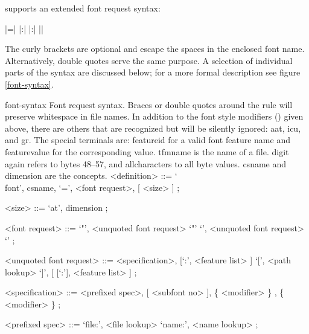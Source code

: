 \endsection


 supports an extended font request syntax:

\beginnarrower
      |\font\foo={|%
      |:|%
      |:|%
      |}|%
\endnarrower

\noindent
The curly brackets are optional and escape the spaces in the enclosed
font name.
%
Alternatively, double quotes serve the same purpose.
%
A selection of individual parts of the syntax are discussed below;
for a more formal description see figure \ref{font-syntax}.

\beginsyntaxfloat
  {font-syntax}
  {Font request syntax.
   Braces or double quotes around the
    rule will
   preserve whitespace in file names.
   In addition to the font style modifiers
   () given above, there
   are others that are recognized but will be silently
   ignored: {\ttfamily aat},
            {\ttfamily icu}, and
            {\ttfamily gr}.
   The special terminals are:
   {\sc feature\textunderscore id} for a valid font
      feature name and
   {\sc feature\textunderscore value} for the corresponding
      value.
   {\sc tfmname} is the name of a  file.
   {\sc digit}  again refers to bytes 48--57, and
   {\sc all\textunderscore characters} to all byte values.
   {\sc csname} and {\sc dimension} are the \TEX concepts.}
%
      <definition>      ::= `\\font', {\sc csname}, `=', <font request>, [ <size> ] ;

      <size>            ::= `at', {\sc dimension} ;

      <font request>    ::= `"', <unquoted font request> `"'
      \alt                  `{', <unquoted font request> `}'
       ;

      <unquoted font request> ::= <specification>, [`:', <feature list> ]
      \alt                        `[', <path lookup> `]', [ [`:'], <feature list> ] ;

      <specification>    ::= <prefixed spec>, [ <subfont no> ], \{ <modifier> \}
      , \{ <modifier> \} ;

      <prefixed spec>    ::= `file:', <file lookup>
      \alt                   `name:', <name lookup> ;


